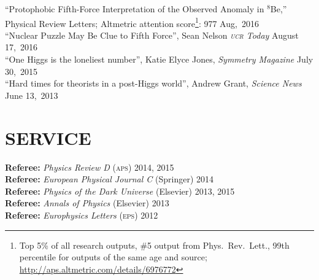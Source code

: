 \documentclass[margin,line]{resume}
\newcommand{\scap}[1]{\textsc{\MakeLowercase{#1}}}
\begin{document}
\begin{resume}
``Protophobic Fifth-Force Interpretation of the Observed Anomaly in $^{8}$Be,''\\
	Physical Review Letters; 
	Altmetric attention score\footnote{Top 5\% of all research outputs, \#5 output from Phys.~Rev.~Lett., 99th percentile for outputs of the same age and source; \url{http://aps.altmetric.com/details/6976772}}: 977
	\hfill Aug,~2016\vspace{.7mm}\\   
``Nuclear Puzzle May Be Clue to Fifth Force'', Sean Nelson \emph{\scap{UCR} Today}
\hfill August 17,~2016\vspace{.7mm}\\   
%
``One Higgs is the loneliest number'', Katie Elyce Jones, \emph{Symmetry Magazine}
\hfill July 30,~2015\vspace{.7mm}\\   
%
``Hard times for theorists in a post-Higgs world'', Andrew Grant, \emph{Science News}
\hfill June 13,~2013\vspace{.7mm}%






\section{\footnotesize \sc
\sffamily 
{}SERVICE
}


\textbf{Referee:} \emph{Physics Review D} (\scap{APS})
\hfill 2014, 2015\vspace{.3mm}\\
%
\textbf{Referee:} \emph{European Physical Journal C} (Springer)
\hfill 2014\vspace{.3mm}\\
%
\textbf{Referee:} \emph{Physics of the Dark Universe} (Elsevier)
\hfill 2013, 2015\vspace{.3mm}\\
%
\textbf{Referee:}  \emph{Annals of Physics} (Elsevier)
\hfill 2013\vspace{.3mm}\\
%
\textbf{Referee:} \emph{Europhysics Letters} (\scap{EPS})
\hfill 2012\vspace{.3mm}%




\end{resume}
\end{document}
